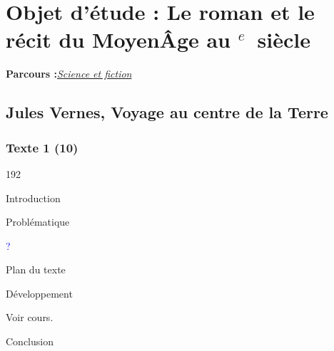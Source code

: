 \documentclass[12pt,a4paper]{article}
\begin{document}
		\section[Sciences et fiction]{Objet d'\'etude : Le roman et le r\'ecit du Moyen\^Age au \textsc{}$^{e}$~siècle}
		\textbf{Parcours :}\textit{\underline{Science et fiction}}
			\subsection{Jules Vernes, Voyage au centre de la Terre}
				\subsubsection{Texte 1 (10)}
\begin{dingautolist}{192}

\item Introduction \par
\item Probl\'ematique \par
	\textcolor{blue}{?}
\item Plan du texte \par
\item D\'eveloppement \par
        Voir cours.

\item Conclusion \par

\end{dingautolist}
\end{document}
